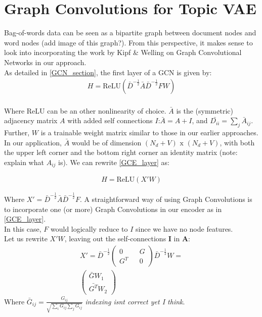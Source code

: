 \documentclass{report}
\begin{document}
\section{Graph Convolutions for Topic VAE}

Bag-of-words data can be seen as a bipartite graph between document nodes and word nodes (add image of this graph?). From this perspective, it makes sense to look into incorporating the work by Kipf \& Welling on Graph Convolutional Networks in our approach. \\
As detailed in \ref{GCN_section}, the first layer of a GCN is given by:
\begin{align}\label{GCE_layer}
H = \text{ReLU}(\bar{D}^{-\frac{1}{2}}\bar{A}\bar{D}^{-\frac{1}{2}}FW)
\end{align}
\\
Where ReLU can be an other nonlinearity of choice. $\bar{A}$ is the (symmetric) adjacency matrix $A$ with added self connections $I$:$\bar{A} = A+I$, and $\bar{D_{ii}}=\sum_j\bar{A}_{ij}$. Further, $W$ is a trainable weight matrix similar to those in our earlier approaches. In our application, $\bar{A}$ would be of dimension $(N_d + V) \text{ x } (N_d + V)$, with both the upper left corner and the bottom right corner an identity matrix (note: explain what $A_{ij}$ is). We can rewrite \ref{GCE_layer} as:

\begin{align}
H = \text{ReLU}(X'W)
\end{align}

Where $X' = \bar{D}^{-\frac{1}{2}}\bar{A}\bar{D}^{-\frac{1}{2}}F$. A straightforward way of using Graph Convolutions is to incorporate one (or more) Graph Convolutions in our encoder as in \ref{GCE_layer}. \\ In this case, $F$ would logically reduce to $I$ since we have no node features. \\
Let us rewrite $X'W$, leaving out the self-connections $\mathbf{I}$ in $\mathbf{A}$: 
\begin{align}
X' = \bar{D}^{-\frac{1}{2}}
\left( \begin{matrix} 
0 && G \\
G^T && 0
\end{matrix} \right) \bar{D}^{-\frac{1}{2}}W = \\
\left(\begin{matrix}
\bar{G}W_1 \\
\bar{G^T}W_2
\end{matrix}\right)\label{highlow}  
\end{align}
Where $\bar{G}_{ij} = 
\frac{G_{ij}}{\sqrt{\sum_i G_{ij} \sum_{j} G_{ij}}}$ \textit{indexing isnt correct yet I think}.
\end{document}
